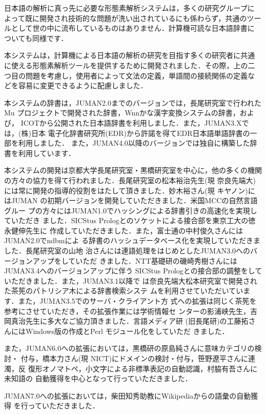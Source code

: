 \documentclass[a4j,titlepage]{jarticle}
\begin{document}
日本語の解析に真っ先に必要な形態素解析システムは，多くの研究グループに
よって既に開発され技術的な問題が洗い出されているにも係わらず，共通のツー
ルとして世の中に流布しているものはありません．計算機可読な日本語辞書に
ついても同様です．

本システムは，計算機による日本語の解析の研究を目指す多くの研究者に共通
に使える形態素解析ツールを提供するために開発されました．その際，上の二
つ目の問題を考慮し，使用者によって文法の定義，単語間の接続関係の定義な
どを容易に変更できるように配慮しました．

本システムの辞書は，JUMAN2.0までのバージョンでは，長尾研究室で行われたMu 
プロジェクトで開発された辞書，Wnnかな漢字変換システムの辞書，および，
ICOTから公開された日本語辞書を利用しました．また，JUMAN3.Xでは，(株)日本
電子化辞書研究所(EDR)から許諾を得てEDR日本語単語辞書の一部を利用しました．
また，JUMAN4.0以降のバージョンでは独自に構築した辞書を利用しています．

本システムの開発は京都大学長尾研究室・黒橋研究室を中心に，他の多くの機関
の方々の協力を得て行われました．長尾研究室の松本裕治先生(現 奈良先端大)
には常に開発の指導的役割をはたして頂きました．妙木裕さん(現 キヤノン)に
はJUMAN の初期バージョンを開発していただきました．米国MCCの自然言語グルー
プの方々にはJUMAN1.0でハッシングによる辞書引きの高速化を実現していただき
ました．SICStus Prologとのソケットによる接合部を東京工大の徳永健伸先生に
作成していただきました．また，富士通の中村俊久さんにはJUMAN2.0でndbmによ
る辞書のハッシュデータベース化を実現していただきました．長尾研究室の山地
治さんには連語処理をはじめとしたJUMAN3.0へのバージョンアップをしていただ
きました．NTT基礎研の磯崎秀樹さんにはJUMAN3.4へのバージョンアップに伴う
SICStus Prologとの接合部の調整をしていただきました．また，JUMAN3.1以降で
は奈良先端大松本研究室で開発された茶筅のパトリシア木による辞書検索システ
ムを利用させていただいています．また，JUMAN3.5でのサーバ・クライアント方
式への拡張は同じく茶筅を参考にさせていただき，その拡張作業には学術情報セ
ンターの影浦峡先生，吉岡真治先生に多大なご協力頂きました．言語メディア研
(旧長尾研)の工藤拓さんにはWindows版の作成とPerl モジュール化をしていただ
きました．

また，JUMAN6.0への拡張においては，黒橋研の原島純さんに意味カテゴリの検討・
付与，橋本力さん(現 NICT)にドメインの検討・付与，笹野遼平さんに連濁，反
復形オノマトペ，小文字による非標準表記の自動認識，村脇有吾さんに未知語の
自動獲得を中心となって行っていただきました．

JUMAN7.0への拡張においては，柴田知秀助教にWikipediaからの語彙の自動獲得
を行っていただきました．
\end{document}
